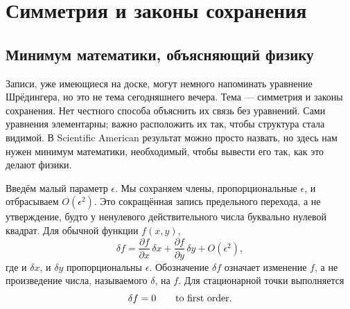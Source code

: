 \chapter{Симметрия и законы сохранения}


\section{Минимум математики, объясняющий физику}

Записи, уже имеющиеся на доске, могут немного напоминать уравнение Шрёдингера, но это не тема сегодняшнего вечера. Тема — симметрия и законы сохранения. Нет честного способа объяснить их связь без уравнений. Сами уравнения элементарны; важно расположить их так, чтобы структура стала видимой. В Scientific American результат можно просто назвать, но здесь нам нужен минимум математики, необходимый, чтобы вывести его так, как это делают физики.

Введём малый параметр \(\epsilon\). Мы сохраняем члены, пропорциональные \(\epsilon\), и отбрасываем \(O(\epsilon^2)\). Это сокращённая запись предельного перехода, а не утверждение, будто у ненулевого действительного числа буквально нулевой квадрат. Для обычной функции \(f(x,y)\),
\begin{equation}
  \delta f
  =\frac{\partial f}{\partial x}\,\delta x
   +\frac{\partial f}{\partial y}\,\delta y
   +O(\epsilon^2),
  \label{eq:first-variation-f}
\end{equation}
где и \(\delta x\), и \(\delta y\) пропорциональны \(\epsilon\). Обозначение \(\delta f\) означает изменение \(f\), а не произведение числа, называемого \(\delta\), на \(f\). Для стационарной точки выполняется
\begin{equation}
  \delta f=0
  \qquad\hbox{to first order.}
  \label{eq:stationary-f}
\end{equation}

